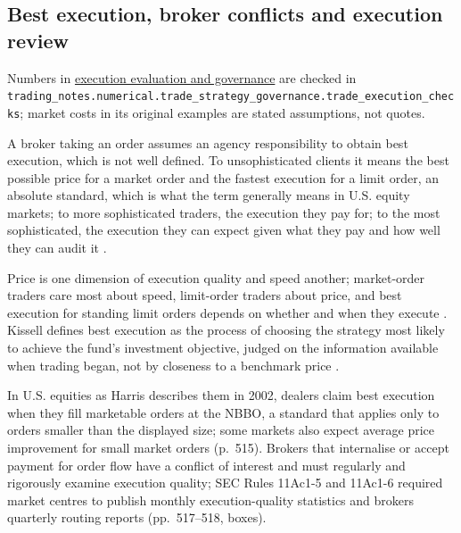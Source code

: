 \subsection{Best execution, broker conflicts and execution review}

Numbers in \hyperref[meth:trade-execution-evaluation-governance]{execution evaluation and governance} are checked in \nolinkurl{trading_notes.numerical.trade_strategy_governance.trade_execution_checks}; market costs in its original examples are stated assumptions, not quotes.

\begin{qfdefinition}\label{def:best-execution}
 A broker taking an order assumes an agency responsibility to obtain best execution, which is not well defined. To unsophisticated clients it means the best possible price for a market order and the fastest execution for a limit order, an absolute standard, which is what the term generally means in U.S. equity markets; to more sophisticated traders, the execution they pay for; to the most sophisticated, the execution they can expect given what they pay and how well they can audit it \citep[chap.~``Brokers'', sec.~7.4.2, pp.~160--161]{alpha-harris}.

Price is one dimension of execution quality and speed another; market-order traders care most about speed, limit-order traders about price, and best execution for standing limit orders depends on whether and when they execute \citep[chap.~``Internalization, Preferencing, and Crossing'', sec.~25.1, p.~515]{alpha-harris}. Kissell defines best execution as the process of choosing the strategy most likely to achieve the fund's investment objective, judged on the information available when trading began, not by closeness to a benchmark price \citep[chap.~3, p.~88]{s7-kissellscience}.

 In U.S. equities as Harris describes them in 2002, dealers claim best execution when they fill marketable orders at the NBBO, a standard that applies only to orders smaller than the displayed size; some markets also expect average price improvement for small market orders (p.~515). Brokers that internalise or accept payment for order flow have a conflict of interest and must regularly and rigorously examine execution quality; SEC Rules 11Ac1-5 and 11Ac1-6 required market centres to publish monthly execution-quality statistics and brokers quarterly routing reports (pp.~517--518, boxes).


\end{qfdefinition}
